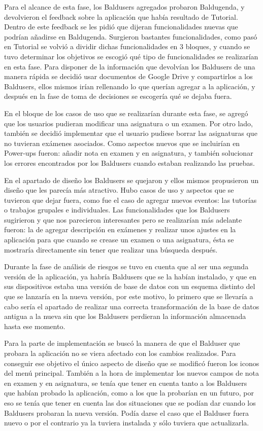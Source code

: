 Para el alcance de esta fase, los Baldusers agregados probaron Baldugenda, y devolvieron el feedback sobre la aplicación que había resultado de Tutorial. Dentro de este feedback se les pidió que dijeran funcionalidades nuevas que podrían añadirse en Baldugenda. Surgieron bastantes funcionalidades, como pasó en Tutorial se volvió a dividir dichas funcionalidades en 3 bloques, y cuando se tuvo determinar los objetivos se escogió qué tipo de funcionalidades se realizarían en esta fase.
Para disponer de la información que devolvían los Baldusers de una manera rápida se decidió usar documentos de Google Drive y compartirlos a los Baldusers, ellos mismos irían rellenando lo que querían agregar a la aplicación, y después en la fase de toma de decisiones se escogería qué se dejaba fuera.

En el bloque de los casos de uso que se realizarían durante esta fase, se agregó que los usuarios pudieran modificar una asignatura o un examen. Por otro lado, también se decidió implementar que el usuario pudiese borrar las asignaturas que no tuvieran exámenes asociados. Como aspectos nuevos que se incluirían en Power-ups fueron: añadir nota en examen y en asignatura, y también solucionar los errores encontrados por los Baldusers cuando estaban realizando las pruebas.

En el apartado de diseño los Baldusers se quejaron y ellos mismos propusieron un diseño que les parecía más atractivo.
Hubo casos de uso y aspectos que se tuvieron que dejar fuera, como fue el caso de agregar nuevos eventos: las tutorías o trabajos grupales e individuales.
Las funcionalidades que los Baldusers sugirieron y que nos parecieron interesantes pero se realizarían más adelante fueron: la de agregar descripción en exámenes y realizar unos ajustes en la aplicación para que cuando se crease un examen o una asignatura, ésta se mostraría directamente sin tener que realizar una búsqueda después.

Durante la fase de análisis de riesgos se tuvo en cuenta que al ser una segunda versión de la aplicación, ya habría Baldusers que se la habían instalado, y que en sus dispositivos estaba una versión de base de datos con un esquema distinto del que se lanzaría en la nueva versión, por este motivo, lo primero que se llevaría a cabo sería el apartado de realizar una correcta transformación de la base de datos antigua a la nueva sin que los Baldusers perdieran la información almacenada hasta ese momento.

Para la parte de implementación se buscó la manera de que el Balduser que probara la aplicación no se viera afectado con los cambios realizados. Para conseguir ese objetivo el único aspecto de diseño que se modificó fueron los iconos del menú principal. También a la hora de implementar los nuevos campos de nota en examen y en asignatura, se tenía que tener en cuenta tanto a los Baldusers que habían probado la aplicación, como a los que la probarían en un futuro, por eso se tenía que tener en cuenta las dos situaciones que se podían dar cuando los Baldusers probaran la nueva versión. Podía darse el caso que el Balduser fuera nuevo o por el contrario ya la tuviera instalada y sólo tuviera que actualizarla.

